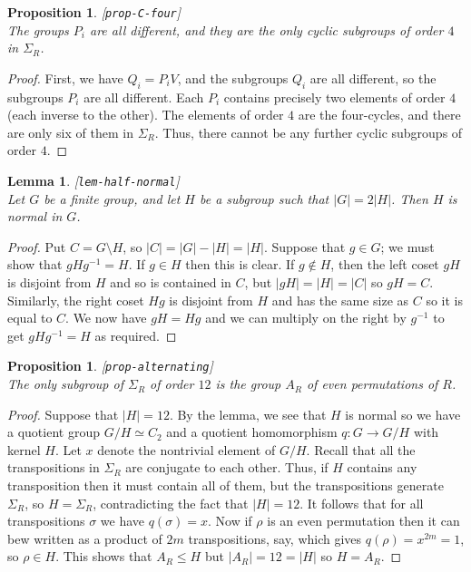 \documentclass{amsart}
\newcommand{\lbl}[1]{\label{#1}\textup{[\texttt{#1}]}\ \\}
\newcommand{\lbl}{\label}
\newcommand{\sg}        {\sigma}
\newcommand{\Sg}        {\Sigma}
\newcommand{\sm}        {\setminus}
\renewcommand{\:}{\colon}
\newtheorem{lemma}[theorem]{Lemma}
\newtheorem{proposition}[theorem]{Proposition}
\theoremstyle{definition}
\begin{document}
\begin{proposition}\lbl{prop-C-four}
 The groups $P_i$ are all different, and they are the only cyclic
 subgroups of order $4$ in $\Sg_R$.
\end{proposition}
\begin{proof}
 First, we have $Q_i=P_iV$, and the subgroups $Q_i$ are all different,
 so the subgroups $P_i$ are all different.  Each $P_i$ contains
 precisely two elements of order $4$ (each inverse to the other).  The
 elements of order $4$ are the four-cycles, and there are only six of
 them in $\Sg_R$.  Thus, there cannot be any further cyclic subgroups
 of order $4$.
\end{proof}

\begin{lemma}\lbl{lem-half-normal}
 Let $G$ be a finite group, and let $H$ be a subgroup such that
 $|G|=2|H|$.  Then $H$ is normal in $G$.
\end{lemma}
\begin{proof}
 Put $C=G\sm H$, so $|C|=|G|-|H|=|H|$.  Suppose that $g\in G$; we must
 show that $gHg^{-1}=H$.  If $g\in H$ then this is clear.  If
 $g\not\in H$, then the left coset $gH$ is disjoint from $H$ and so is
 contained in $C$, but $|gH|=|H|=|C|$ so $gH=C$.  Similarly, the right
 coset $Hg$ is disjoint from $H$ and has the same size as $C$ so it is
 equal to $C$.  We now have $gH=Hg$ and we can multiply on the right
 by $g^{-1}$ to get $gHg^{-1}=H$ as required.
\end{proof}

\begin{proposition}\lbl{prop-alternating}
 The only subgroup of $\Sg_R$ of order $12$ is the group $A_R$ of even
 permutations of $R$.
\end{proposition}
\begin{proof}
 Suppose that $|H|=12$.  By the lemma, we see that $H$ is normal so we
 have a quotient group $G/H\simeq C_2$ and a quotient homomorphism
 $q\:G\to G/H$ with kernel $H$.  Let $x$ denote the nontrivial element
 of $G/H$.  Recall that all the transpositions in $\Sg_R$ are
 conjugate to each other.  Thus, if $H$ contains any transposition
 then it must contain all of them, but the transpositions generate
 $\Sg_R$, so $H=\Sg_R$, contradicting the fact that $|H|=12$.  It
 follows that for all transpositions $\sg$ we have $q(\sg)=x$.  Now if
 $\rho$ is an even permutation then it can bew written as a product of
 $2m$ transpositions, say, which gives $q(\rho)=x^{2m}=1$, so
 $\rho\in H$.  This shows that $A_R\leq H$ but $|A_R|=12=|H|$ so
 $H=A_R$. 
\end{proof}
\end{document}
